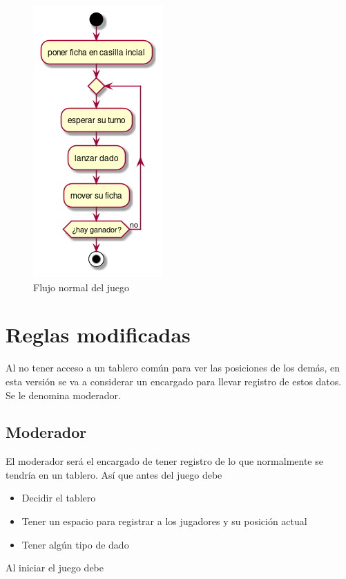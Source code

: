 \documentclass[11pt]{article}
\begin{document}
\begin{figure}[htbp]
\centering
\includegraphics[scale=0.75]{imgs/normal_flux.png}
\caption{\label{fig:normal-flux}Flujo normal del juego}
\end{figure}

\section{Reglas modificadas}
\label{sec:org86edfd7}

Al no tener acceso a un tablero común para ver las posiciones de los demás, en
esta versión se va a considerar un encargado para llevar registro de estos
datos. Se le denomina \guillemotleft{}moderador\guillemotright{}.

\subsection{Moderador}
\label{sec:org1ef8bcf}

El moderador será el encargado de tener registro de lo que normalmente se
tendría en un tablero. Así que antes del juego debe

\begin{itemize}
\item Decidir el tablero
\item Tener un espacio para registrar a los jugadores y su posición actual
\item Tener algún tipo de dado
\end{itemize}

Al iniciar el juego debe
\end{document}
